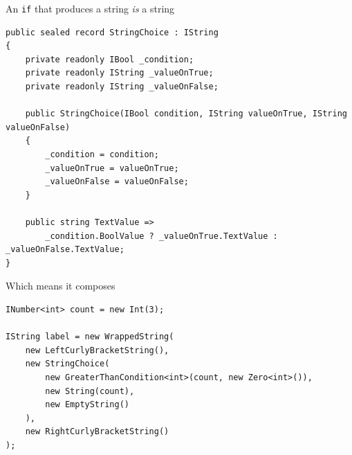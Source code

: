 \documentclass[aspectratio=169,10pt,t]{beamer}
\begin{document}
\begin{frame}[fragile]{An \texttt{if} that produces a string \emph{is} a string}
  \vspace{0.1em}
\begin{lstlisting}[basicstyle=\ttfamily\scriptsize]
public sealed record StringChoice : IString
{
    private readonly IBool _condition;
    private readonly IString _valueOnTrue;
    private readonly IString _valueOnFalse;

    public StringChoice(IBool condition, IString valueOnTrue, IString valueOnFalse)
    {
        _condition = condition;
        _valueOnTrue = valueOnTrue;
        _valueOnFalse = valueOnFalse;
    }

    public string TextValue =>
        _condition.BoolValue ? _valueOnTrue.TextValue : _valueOnFalse.TextValue;
}
\end{lstlisting}
  \vspace{0.3em}
\end{frame}

\begin{frame}[fragile]{Which means it composes}
  \vspace{0.6em}
\begin{lstlisting}
INumber<int> count = new Int(3);

IString label = new WrappedString(
    new LeftCurlyBracketString(),
    new StringChoice(
        new GreaterThanCondition<int>(count, new Zero<int>()),
        new String(count),
        new EmptyString()
    ),
    new RightCurlyBracketString()
);
\end{lstlisting}
  \vspace{0.9em}
\end{frame}
\end{document}
